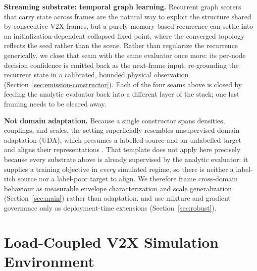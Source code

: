 \documentclass[journal]{IEEEtran}
\begin{document}
\textbf{Streaming substrate: temporal graph learning.} Recurrent graph scorers
that carry state across frames \cite{PLACEHOLDER_gru} are the natural way to
exploit the structure shared by consecutive V2X frames, but a purely
memory-based recurrence can settle into an initialization-dependent collapsed
fixed point, where the converged topology reflects the seed rather than the
scene. Rather than regularize the recurrence generically, we close that seam with
the same evaluator once more: its per-node decision confidence is emitted back as
the next-frame input, re-grounding the recurrent state in a calibrated, bounded
physical observation (Section~\ref{sec:emission-constructor}). Each of the four
seams above is closed by feeding the analytic evaluator back into a different
layer of the stack; one last framing needs to be cleared away.

\textbf{Not domain adaptation.} Because a single constructor spans densities,
couplings, and scales, the setting superficially resembles unsupervised domain
adaptation (UDA), which presumes a labelled source and an unlabelled target and
aligns their representations
\cite{PLACEHOLDER_uda_survey,PLACEHOLDER_dann,PLACEHOLDER_mmd,PLACEHOLDER_coral}.
That template does not apply here precisely because every substrate above is
already supervised by the analytic evaluator: it supplies a training objective in
\emph{every} simulated regime, so there is neither a label-rich source nor a
label-poor target to align. We therefore frame cross-domain behaviour as
measurable envelope characterization and scale generalization
(Section~\ref{sec:main}) rather than adaptation, and use mixture and gradient
governance \cite{PLACEHOLDER_domain_generalization,PLACEHOLDER_pcgrad,PLACEHOLDER_gradnorm}
only as deployment-time extensions (Section~\ref{sec:robust}).

\section{Load-Coupled V2X Simulation Environment}\label{sec:env}
\end{document}
